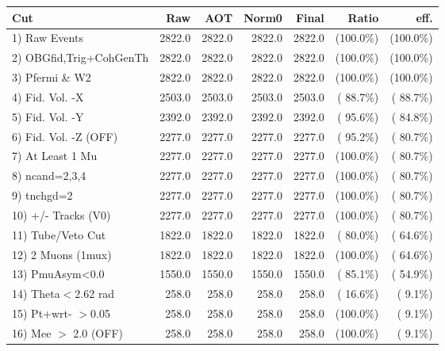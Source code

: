  \begin{table}[h!]\centering
 \begin{tabular}{||l||r|r|r|r|r|r||}
 \hline
 \hline
 Cut & Raw & AOT & Norm0 & Final & Ratio & eff.       \\
 \hline
  1) Raw Events           &       2822.0 &       2822.0 &       2822.0 &       2822.0 & (100.0\%) & (100.0\%) \\
  2) OBGfid,Trig+CohGenTh &       2822.0 &       2822.0 &       2822.0 &       2822.0 & (100.0\%) & (100.0\%) \\
  3) Pfermi \& W2         &       2822.0 &       2822.0 &       2822.0 &       2822.0 & (100.0\%) & (100.0\%) \\
  4) Fid. Vol. -X         &       2503.0 &       2503.0 &       2503.0 &       2503.0 & ( 88.7\%) & ( 88.7\%) \\
  5) Fid. Vol. -Y         &       2392.0 &       2392.0 &       2392.0 &       2392.0 & ( 95.6\%) & ( 84.8\%) \\
  6) Fid. Vol. -Z (OFF)   &       2277.0 &       2277.0 &       2277.0 &       2277.0 & ( 95.2\%) & ( 80.7\%) \\
  7) At Least 1 Mu        &       2277.0 &       2277.0 &       2277.0 &       2277.0 & (100.0\%) & ( 80.7\%) \\
  8) ncand=2,3,4          &       2277.0 &       2277.0 &       2277.0 &       2277.0 & (100.0\%) & ( 80.7\%) \\
  9) tnchgd=2             &       2277.0 &       2277.0 &       2277.0 &       2277.0 & (100.0\%) & ( 80.7\%) \\
 10) +/- Tracks (V0)      &       2277.0 &       2277.0 &       2277.0 &       2277.0 & (100.0\%) & ( 80.7\%) \\
 11) Tube/Veto Cut        &       1822.0 &       1822.0 &       1822.0 &       1822.0 & ( 80.0\%) & ( 64.6\%) \\
 12) 2 Muons (1mux)       &       1822.0 &       1822.0 &       1822.0 &       1822.0 & (100.0\%) & ( 64.6\%) \\
 13) PmuAsym<0.0          &       1550.0 &       1550.0 &       1550.0 &       1550.0 & ( 85.1\%) & ( 54.9\%) \\
 14) Theta$<$2.62 rad     &        258.0 &        258.0 &        258.0 &        258.0 & ( 16.6\%) & (  9.1\%) \\
 15) Pt+wrt- $>$0.05      &        258.0 &        258.0 &        258.0 &        258.0 & (100.0\%) & (  9.1\%) \\
 16) Mee $>$ 2.0  (OFF)   &        258.0 &        258.0 &        258.0 &        258.0 & (100.0\%) & (  9.1\%) \\

\end{tabular}
\end{table}
